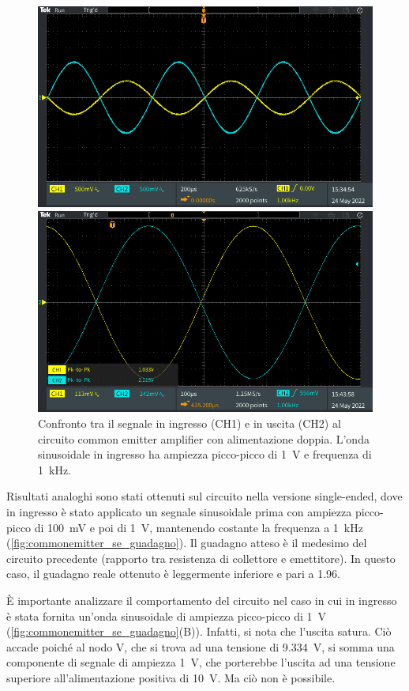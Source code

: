 \begin{figure}[h!]
	\centering
	\includegraphics[width=0.7\linewidth]{./ImageFiles/Laboratorio 3/TEK00006}
	\vspace{1cm}
	
	\includegraphics[width=0.7\linewidth]{./ImageFiles/Laboratorio 3/TEK00007}
	\caption{Confronto tra il segnale in ingresso (CH1) e in uscita (CH2) al circuito common emitter amplifier con alimentazione doppia. L'onda sinusoidale in ingresso ha ampiezza picco-picco di \SI{1}{\volt} e frequenza di \SI{1}{\kilo\hertz}.}
	\label{fig:commonemitter_guadagno}
\end{figure}

\noindent
Risultati analoghi sono stati ottenuti sul circuito nella versione single-ended, dove in ingresso è stato applicato un segnale sinusoidale prima con ampiezza picco-picco di \SI{100}{\milli\volt} e poi di \SI{1}{\volt}, mantenendo costante la frequenza a \SI{1}{\kilo\hertz} (\Fig\ref{fig:commonemitter_se_guadagno}). Il guadagno atteso è il medesimo del circuito precedente (rapporto tra resistenza di collettore e emettitore). In questo caso, il guadagno reale ottenuto è leggermente inferiore e pari a 1.96.

\noindent
\`E importante analizzare il comportamento del circuito nel caso in cui in ingresso è stata fornita un'onda sinusoidale di ampiezza picco-picco di \SI{1}{\volt} (\Fig\ref{fig:commonemitter_se_guadagno}(B)). Infatti, si nota che l'uscita satura. Ciò accade poiché al nodo V, che si trova ad una tensione di \SI{9.334}{\volt}, si somma una componente di segnale di ampiezza \SI{1}{\volt}, che porterebbe l'uscita ad una tensione superiore all'alimentazione positiva di \SI{10}{\volt}. Ma ciò non è possibile. 

